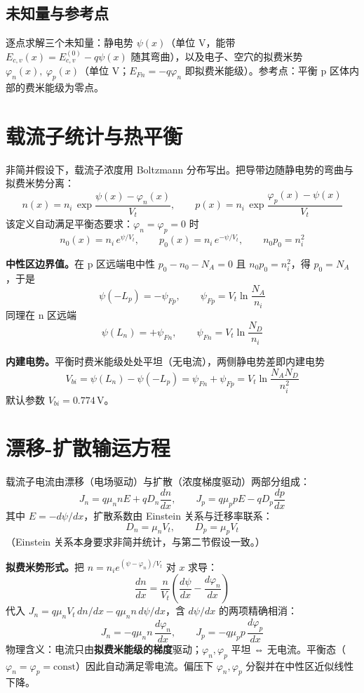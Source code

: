 \documentclass[11pt]{ctexart}
\begin{document}
\subsection{未知量与参考点}
逐点求解三个未知量：静电势
\(\psi(x)\)（单位 V，能带 $E_{c,v}(x)=E_{c,v}^{(0)}-q\psi(x)$ 随其弯曲），以及电子、空穴的拟费米势
\(\varphi_n(x),\ \varphi_p(x)\)（单位 V；$E_{Fn}=-q\varphi_n$ 即拟费米能级）。参考点：平衡 p 区体内部的费米能级为零点。

\section{载流子统计与热平衡}

非简并假设下，载流子浓度用 Boltzmann 分布写出。把导带边随静电势的弯曲与拟费米势分离：
\[n(x)=n_i\,\exp\!\frac{\psi(x)-\varphi_n(x)}{V_t},\qquad p(x)=n_i\,\exp\!\frac{\varphi_p(x)-\psi(x)}{V_t}\]
该定义自动满足平衡态要求：$\varphi_n=\varphi_p=0$ 时
\[n_0(x)=n_i\,e^{\psi/V_t},\qquad p_0(x)=n_i\,e^{-\psi/V_t},\qquad n_0 p_0=n_i^2\]

\textbf{中性区边界值。}在 p 区远端电中性 $p_0-n_0-N_A=0$ 且 $n_0p_0=n_i^2$，得 $p_0=N_A$，于是
\[\psi(-L_p)=-\psi_{Fp},\qquad \psi_{Fp}=V_t\ln\frac{N_A}{n_i}\]
同理在 n 区远端
\[\psi(L_n)=+\psi_{Fn},\qquad \psi_{Fn}=V_t\ln\frac{N_D}{n_i}\]

\textbf{内建电势。}平衡时费米能级处处平坦（无电流），两侧静电势差即内建电势
\[V_{bi}=\psi(L_n)-\psi(-L_p)=\psi_{Fn}+\psi_{Fp}=V_t\ln\frac{N_A N_D}{n_i^2}\]
默认参数 $V_{bi}=0.774\,\mathrm{V}$。

\section{漂移-扩散输运方程}

载流子电流由漂移（电场驱动）与扩散（浓度梯度驱动）两部分组成：
\[J_n=q\mu_n n E+q D_n\frac{dn}{dx},\qquad J_p=q\mu_p p E-q D_p\frac{dp}{dx}\]
其中 $E=-d\psi/dx$，扩散系数由 Einstein 关系与迁移率联系：
\[D_n=\mu_n V_t,\qquad D_p=\mu_p V_t\]
（Einstein 关系本身要求非简并统计，与第二节假设一致。）

\textbf{拟费米势形式。}把 $n=n_i e^{(\psi-\varphi_n)/V_t}$ 对 $x$ 求导：
\[\frac{dn}{dx}=\frac{n}{V_t}\left(\frac{d\psi}{dx}-\frac{d\varphi_n}{dx}\right)\]
代入 $J_n=q\mu_n V_t\, dn/dx-q\mu_n n\, d\psi/dx$，含 $d\psi/dx$ 的两项精确相消：
\[J_n=-q\mu_n n\,\frac{d\varphi_n}{dx},\qquad J_p=-q\mu_p p\,\frac{d\varphi_p}{dx}\]
物理含义：电流只由\textbf{拟费米能级的梯度}驱动；$\varphi_n,\varphi_p$ 平坦 ⇔ 无电流。平衡态（$\varphi_n=\varphi_p=\mathrm{const}$）因此自动满足零电流。偏压下 $\varphi_n,\varphi_p$ 分裂并在中性区近似线性下降。
\end{document}
